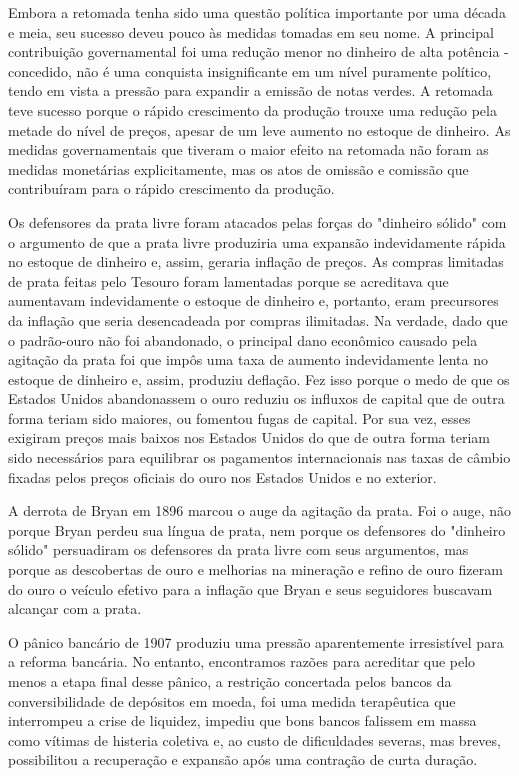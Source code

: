 \documentclass[a4paper,12pt]{article}[abntex2]
\begin{document}
Embora a retomada tenha sido uma questão política importante por uma década e meia, seu sucesso deveu pouco às medidas tomadas em seu nome. A principal contribuição governamental foi uma redução menor no dinheiro de alta potência - concedido, não é uma conquista insignificante em um nível puramente político, tendo em vista a pressão para expandir a emissão de notas verdes. A retomada teve sucesso porque o rápido crescimento da produção trouxe uma redução pela metade do nível de preços, apesar de um leve aumento no estoque de dinheiro. As medidas governamentais que tiveram o maior efeito na retomada não foram as medidas monetárias explicitamente, mas os atos de omissão e comissão que contribuíram para o rápido crescimento da produção.

Os defensores da prata livre foram atacados pelas forças do "dinheiro sólido" com o argumento de que a prata livre produziria uma expansão indevidamente rápida no estoque de dinheiro e, assim, geraria inflação de preços. As compras limitadas de prata feitas pelo Tesouro foram lamentadas porque se acreditava que aumentavam indevidamente o estoque de dinheiro e, portanto, eram precursores da inflação que seria desencadeada por compras ilimitadas. Na verdade, dado que o padrão-ouro não foi abandonado, o principal dano econômico causado pela agitação da prata foi que impôs uma taxa de aumento indevidamente lenta no estoque de dinheiro e, assim, produziu deflação. Fez isso porque o medo de que os Estados Unidos abandonassem o ouro reduziu os influxos de capital que de outra forma teriam sido maiores, ou fomentou fugas de capital. Por sua vez, esses exigiram preços mais baixos nos Estados Unidos do que de outra forma teriam sido necessários para equilibrar os pagamentos internacionais nas taxas de câmbio fixadas pelos preços oficiais do ouro nos Estados Unidos e no exterior.

A derrota de Bryan em 1896 marcou o auge da agitação da prata. Foi o auge, não porque Bryan perdeu sua língua de prata, nem porque os defensores do "dinheiro sólido" persuadiram os defensores da prata livre com seus argumentos, mas porque as descobertas de ouro e melhorias na mineração e refino de ouro fizeram do ouro o veículo efetivo para a inflação que Bryan e seus seguidores buscavam alcançar com a prata.

O pânico bancário de 1907 produziu uma pressão aparentemente irresistível para a reforma bancária. No entanto, encontramos razões para acreditar que pelo menos a etapa final desse pânico, a restrição concertada pelos bancos da conversibilidade de depósitos em moeda, foi uma medida terapêutica que interrompeu a crise de liquidez, impediu que bons bancos falissem em massa como vítimas de histeria coletiva e, ao custo de dificuldades severas, mas breves, possibilitou a recuperação e expansão após uma contração de curta duração.
\end{document}
